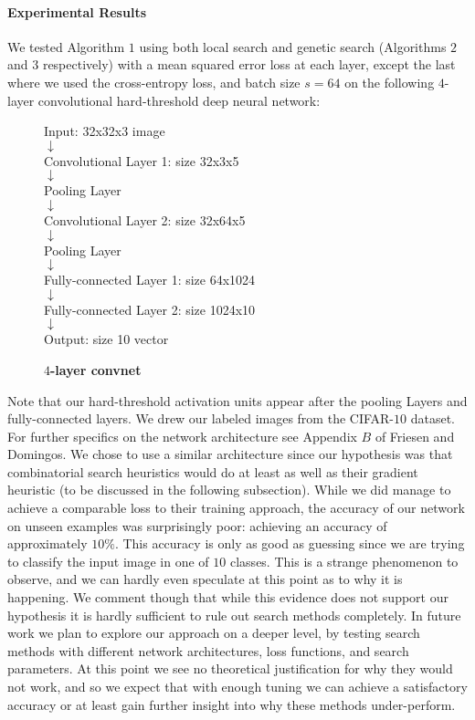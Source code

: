 \paragraph{Experimental Results}
We tested Algorithm $1$ using both local search and genetic search (Algorithms $2$ and $3$ respectively) with a mean squared error loss at each layer, except the last where we used the cross-entropy loss, and batch size $s=64$ on the following $4$-layer convolutional hard-threshold deep neural network: 
\begin{figure}[H]
\caption{\textbf{$4$-layer convnet}}
\begin{center}
	\begin{small}
		Input: 32x32x3 image\\
		$\downarrow$ \\
		Convolutional Layer 1: size 32x3x5 \\
		$\downarrow$\\
		Pooling Layer \\
		$\downarrow$ \\
		Convolutional Layer 2: size 32x64x5\\
		$\downarrow$\\
		Pooling Layer\\
		$\downarrow$ \\
		Fully-connected Layer 1: size 64x1024\\
		$\downarrow$ \\
		Fully-connected Layer 2: size 1024x10\\
		$\downarrow$\\
		Output: size 10 vector
	\end{small}
\end{center}
\end{figure}
Note that our hard-threshold activation units appear after the pooling Layers and fully-connected layers. We drew our labeled images from the CIFAR-$10$ dataset. For further specifics on the network architecture see Appendix $B$ of Friesen and Domingos\cite{friesen2017deep}. We chose to use a similar architecture since our hypothesis was that combinatorial search heuristics would do at least as well as their gradient heuristic (to be discussed in the following subsection). While we did manage to achieve a comparable loss to their training approach, the accuracy of our network on unseen examples was surprisingly poor: achieving an accuracy of approximately $10\%$. This accuracy is only as good as guessing since we are trying to classify the input image in one of $10$ classes. This is a strange phenomenon to observe, and we can hardly even speculate at this point as to why it is happening. We comment though that while this evidence does not support our hypothesis it is hardly sufficient to rule out search methods completely. In future work we plan to explore our approach on a deeper level, by testing search methods with different network architectures, loss functions, and search parameters. At this point we see no theoretical justification for why they would not work, and so we expect that with enough tuning we can achieve a satisfactory accuracy or at least gain further insight into why these methods under-perform.
